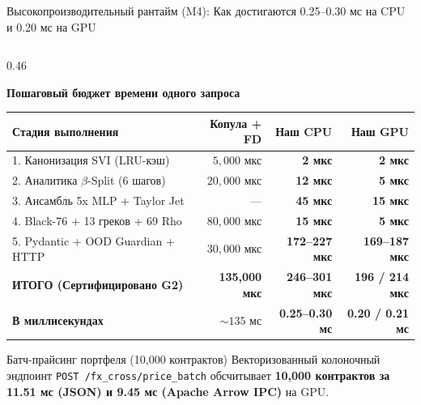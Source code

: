 \documentclass[aspectratio=169, 9pt]{beamer}
\begin{document}
\begin{frame}{Высокопроизводительный рантайм (M4): Как достигаются 0.25--0.30 мс на CPU и 0.20 мс на GPU}
\begin{columns}[T]
    \begin{column}{0.46\textwidth}
      \begin{table}
        \centering
        \scriptsize
        \renewcommand{\arraystretch}{1.22}
        \textbf{Пошаговый бюджет времени одного запроса}\\[0.3em]
        \begin{tabular}{@{}lrrr@{}}
          \toprule
          \textbf{Стадия выполнения} & \textbf{Копула + FD} & \textbf{Наш CPU} & \textbf{Наш GPU} \\
          \midrule
          \rowcolor{sberbg} 1. Канонизация SVI (LRU-кэш) & $5,000$ мкс & \textbf{2 мкс} & \textbf{2 мкс} \\
          2. Аналитика $\beta$-Split (6 шагов) & $20,000$ мкс & \textbf{12 мкс} & \textbf{5 мкс} \\
          \rowcolor{sberbg} 3. Ансамбль 5x MLP + Taylor Jet & --- & \textbf{45 мкс} & \textbf{15 мкс} \\
          4. Black-76 + 13 греков + 69 Rho & $80,000$ мкс & \textbf{15 мкс} & \textbf{5 мкс} \\
          \rowcolor{sberbg} 5. Pydantic + OOD Guardian + HTTP & $30,000$ мкс & \textbf{172--227 мкс} & \textbf{169--187 мкс} \\
          \midrule
          \textbf{ИТОГО (Сертифицировано G2)} & \textbf{135,000 мкс} & \textbf{\color{sberemerald}246--301 мкс} & \textbf{\color{sberemerald}196 / 214 мкс} \\
          \textbf{В миллисекундах} & $\sim 135$ мс & \textbf{\color{sberemerald}0.25--0.30 мс} & \textbf{\color{sberemerald}0.20 / 0.21 мс} \\
          \bottomrule
        \end{tabular}
      \end{table}

      \vspace{0.15cm}
      \begin{block}{\scriptsize Батч-прайсинг портфеля (10,000 контрактов)}
        \scriptsize Векторизованный колоночный эндпоинт \texttt{POST /fx\_cross/price\_batch} обсчитывает \textbf{10,000 контрактов за 11.51 мс (JSON) и 9.45 мс (Apache Arrow IPC)} на GPU.
      \end{block}
    \end{column}
  \end{columns}
\end{frame}
\end{document}
